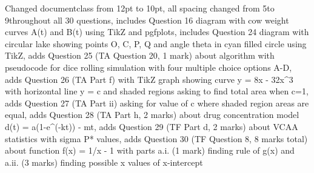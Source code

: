 Changed documentclass from 12pt to 10pt, all spacing changed from 5\baselineskip to 9\baselineskip throughout all 30 questions, includes Question 16 diagram with cow weight curves A(t) and B(t) using TikZ and pgfplots, includes Question 24 diagram with circular lake showing points O, C, P, Q and angle theta in cyan filled circle using TikZ, adds Question 25 (TA Question 20, 1 mark) about algorithm with pseudocode for dice rolling simulation with four multiple choice options A-D, adds Question 26 (TA Part f) with TikZ graph showing curve y = 8x - 32x^3 with horizontal line y = c and shaded regions asking to find total area when c=1, adds Question 27 (TA Part ii) asking for value of c where shaded region areas are equal, adds Question 28 (TA Part h, 2 marks) about drug concentration model d(t) = a(1-e^(-kt)) - mt, adds Question 29 (TF Part d, 2 marks) about VCAA statistics with sigma P* values, adds Question 30 (TF Question 8, 8 marks total) about function f(x) = 1/x - 1 with parts a.i. (1 mark) finding rule of g(x) and a.ii. (3 marks) finding possible x values of x-intercept